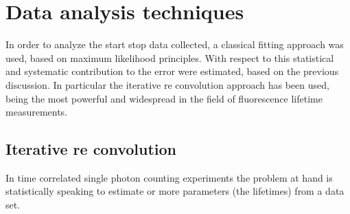 \section{Data analysis techniques}
In order to analyze the start stop data collected, a classical fitting approach was used, based on maximum likelihood principles.
With respect to this statistical and systematic contribution to the error were estimated, based on the previous discussion.
In particular the iterative re convolution approach has been used, being the most powerful and widespread in the field of fluorescence lifetime measurements.

\subsection{Iterative re convolution}
In time correlated single photon counting experiments the problem at hand is statistically speaking to estimate or more parameters (the lifetimes) from a data set.

